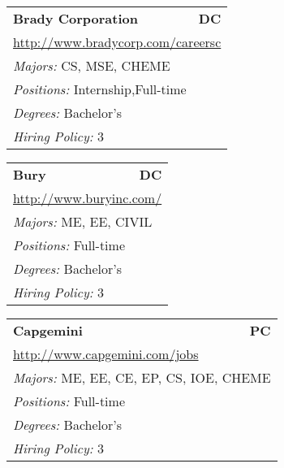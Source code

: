 \documentclass[twoside]{article}
\begin{document}
\begin{center}
\begin{multicols}{3}
\begin{FlushLeft}
\begin{minipage}{\columnwidth}
\end{minipage}
 
\begin{minipage}{\columnwidth}\begin{tabularx}{.95\columnwidth}{Xr}
                 {\Large\bf Brady Corporation} & {\Large\bf DC}\\
    \multicolumn{2}{p{.95\columnwidth}}{\url{http://www.bradycorp.com/careersc}}\\
    \multicolumn{2}{p{.95\columnwidth}}{\emph{Majors:} CS, MSE, CHEME}\\
    \multicolumn{2}{p{.95\columnwidth}}{\emph{Positions:} Internship,Full-time}\\
    \multicolumn{2}{p{.95\columnwidth}}{\emph{Degrees:} Bachelor's}\\
    \multicolumn{2}{p{.95\columnwidth}}{\emph{Hiring Policy:} 3}\\
    \end{tabularx}
    
\end{minipage}
 
\begin{minipage}{\columnwidth}\begin{tabularx}{.95\columnwidth}{Xr}
                 {\Large\bf Bury} & {\Large\bf DC}\\
    \multicolumn{2}{p{.95\columnwidth}}{\url{http://www.buryinc.com/}}\\
    \multicolumn{2}{p{.95\columnwidth}}{\emph{Majors:} ME, EE, CIVIL}\\
    \multicolumn{2}{p{.95\columnwidth}}{\emph{Positions:} Full-time}\\
    \multicolumn{2}{p{.95\columnwidth}}{\emph{Degrees:} Bachelor's}\\
    \multicolumn{2}{p{.95\columnwidth}}{\emph{Hiring Policy:} 3}\\
    \end{tabularx}
    
\end{minipage}
 
\begin{minipage}{\columnwidth}\begin{tabularx}{.95\columnwidth}{Xr}
                 {\Large\bf Capgemini} & {\Large\bf PC}\\
    \multicolumn{2}{p{.95\columnwidth}}{\url{http://www.capgemini.com/jobs}}\\
    \multicolumn{2}{p{.95\columnwidth}}{\emph{Majors:} ME, EE, CE, EP, CS, IOE, CHEME}\\
    \multicolumn{2}{p{.95\columnwidth}}{\emph{Positions:} Full-time}\\
    \multicolumn{2}{p{.95\columnwidth}}{\emph{Degrees:} Bachelor's}\\
    \multicolumn{2}{p{.95\columnwidth}}{\emph{Hiring Policy:} 3}\\
    \end{tabularx}
    

\end{minipage}
\end{FlushLeft}
\end{multicols}
\end{center}
\end{document}
